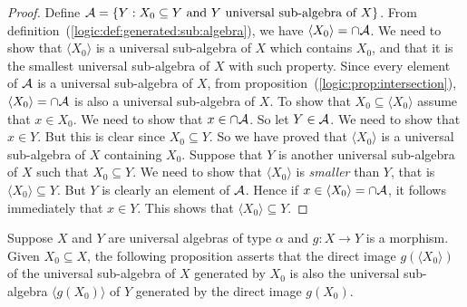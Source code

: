 \begin{proof}
Define ${\cal A}=\{Y: X_{0}\subseteq Y\mbox{\ and\ } Y\mbox{\
universal sub-algebra of\ }X\}$. From
definition~(\ref{logic:def:generated:sub:algebra}), we have $\langle
X_{0}\rangle = \cap{\cal A}$. We need to show that $\langle
X_{0}\rangle$ is a universal sub-algebra of $X$ which contains
$X_{0}$, and that it is the smallest universal sub-algebra of $X$
with such property. Since every element of ${\cal A}$ is a universal
sub-algebra of $X$, from
proposition~(\ref{logic:prop:intersection}), $\langle X_{0}\rangle
=\cap{\cal A}$ is also a universal sub-algebra of $X$. To show that
$X_{0}\subseteq \langle X_{0}\rangle$ assume that $x\in X_{0}$. We
need to show that $x\in\cap{\cal A}$. So let $Y\in{\cal A}$. We need
to show that $x\in Y$. But this is clear since $X_{0}\subseteq Y$.
So we have proved that $\langle X_{0}\rangle$ is a universal
sub-algebra of $X$ containing $X_{0}$. Suppose that $Y$ is another
universal sub-algebra of $X$ such that $X_{0}\subseteq Y$. We need
to show that $\langle X_{0}\rangle$ is {\em smaller} than $Y$, that
is $\langle X_{0}\rangle\subseteq Y$. But $Y$ is clearly an element
of ${\cal A}$. Hence if $x\in\langle X_{0}\rangle =\cap{\cal A}$, it
follows immediately that $x\in Y$. This shows that $\langle
X_{0}\rangle \subseteq Y$.
\end{proof}

Suppose $X$ and $Y$ are universal algebras of type $\alpha$ and
$g:X\to Y$ is a morphism. Given $X_{0}\subseteq X$, the following
proposition asserts that the direct image $g(\langle X_{0}\rangle)$
of the universal sub-algebra of $X$ generated by $X_{0}$ is also the
universal sub-algebra $\langle g(X_{0})\rangle$ of $Y$ generated by
the direct image $g(X_{0})$.

